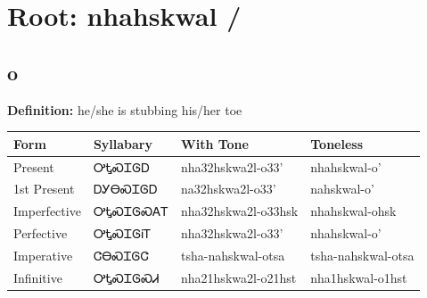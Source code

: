 \documentclass{article}%
\begin{document}
%
\normalsize%
\section*{Root: nhahskwal / }%
\subsection*{o}%
\textbf{Definition: }%
he/she is stubbing his/her toe%
\\[0.5em]%
\begin{tabular}{|l|l|l|l|}%
\hline%
\textbf{Form}&\textbf{Syllabary}&\textbf{With Tone}&\textbf{Toneless}\\%
\hline%
Present&ᎤᎿᏍᏆᎶᎠ&nha32hskwa2l{-}o33'&nhahskwal{-}o'\\%
1st Present&ᎠᎩᎾᏍᏆᎶᎠ&na32hskwa2l{-}o33'&nahskwal{-}o'\\%
Imperfective&ᎤᎿᏍᏆᎶᏍᎪᎢ&nha32hskwa2l{-}o33hsk&nhahskwal{-}ohsk\\%
Perfective&ᎤᎿᏍᏆᎶᎥᎢ&nha32hskwa2l{-}o33'&nhahskwal{-}o'\\%
Imperative&ᏣᎾᏍᏆᎶᏣ&tsha{-}nahskwal{-}otsa&tsha{-}nahskwal{-}otsa\\%
Infinitive&ᎤᎿᏍᏆᎶᏍᏗ&nha21hskwa2l{-}o21hst&nha1hskwal{-}o1hst\\%
\hline%
\end{tabular}%
\\[1em]%
\end{document}
